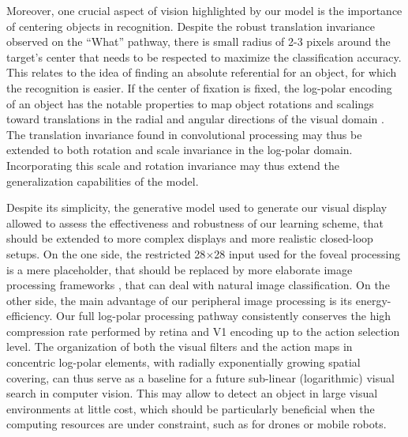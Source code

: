 Moreover, one crucial aspect of vision highlighted by our model is the importance of centering objects in recognition. Despite the robust translation invariance observed on the ``What'' pathway, there is small radius of 2-3 pixels around the target's center that needs to be respected to maximize the classification accuracy. This relates to the idea of finding an absolute referential for an object, for which the recognition is easier. If the center of fixation is fixed, the log-polar encoding of an object has the notable properties to map object rotations and scalings toward translations in the radial and angular directions of the visual domain \cite{Traver10}. The translation invariance found in convolutional processing may thus be extended to both rotation and scale invariance in the log-polar domain. Incorporating this scale and rotation invariance may thus extend the generalization capabilities of the model.



Despite its simplicity, the generative model used to generate our visual display allowed to assess the effectiveness and robustness of our learning scheme, that should be extended to more complex displays and more realistic closed-loop setups.
On the one side, the restricted 28$\times$28 input used for the foveal processing is a mere placeholder, that should be replaced by more elaborate image processing frameworks
\cite{simonyan2014very}, that can deal with natural image classification. 
On the other side, the main advantage of our peripheral image processing is its  energy-efficiency. Our full log-polar processing pathway consistently conserves the high compression rate performed by retina and V1 encoding up to the action selection level. The organization of both the visual filters and the action maps in concentric log-polar elements, with radially exponentially growing spatial covering, can thus serve as a baseline for a future sub-linear (logarithmic) visual search in computer vision. This may allow to detect an object in large visual environments at little cost, which should be particularly beneficial when the computing resources are under constraint, such as for drones or mobile robots. 


